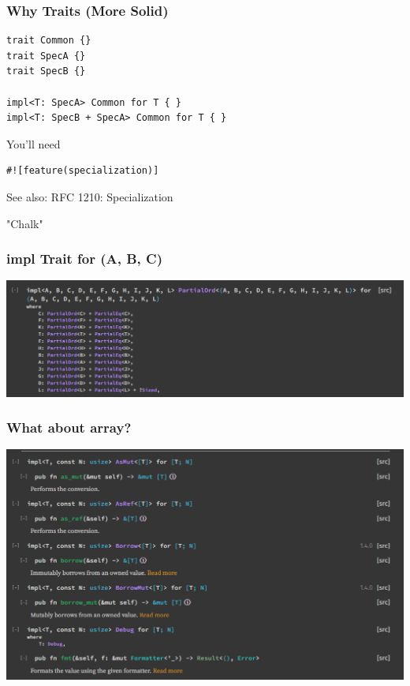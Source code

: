 \documentclass[UTF-8]{ctexbeamer}
\begin{document}
\begin{frame}[fragile]
  \frametitle{Why Traits (More Solid)}

  \begin{verbatim}
trait Common {}
trait SpecA {}
trait SpecB {}

impl<T: SpecA> Common for T { }
impl<T: SpecB + SpecA> Common for T { }
  \end{verbatim}

  \pause
  \vspace{1em}

  You'll need
  \begin{verbatim}
#![feature(specialization)]
  \end{verbatim}

  See also: RFC 1210: Specialization

  \pause
  \vspace{1em}

  "Chalk"
\end{frame}

\begin{frame}
  \frametitle{impl Trait for (A, B, C)}

  \includegraphics[width=\textwidth]{assets/tuple.png}
\end{frame}

\begin{frame}
  \frametitle{What about array?}

  \includegraphics[width=\textwidth]{assets/array-good.png}
\end{frame}
\end{document}
